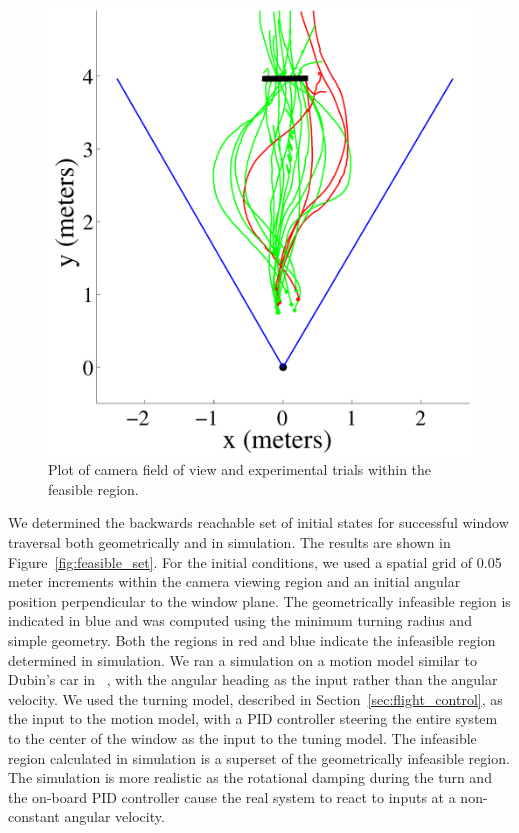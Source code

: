 \documentclass{aamas2013}
\begin{document}
\begin{figure}[tb]
\centering
\includegraphics[width=\linewidth]{figures/flight_paths_feasible.pdf}
\caption{Plot of camera field of view and experimental trials within the feasible region.}
\label{fig:flight_paths_feasible}
\end{figure}

We determined the backwards reachable set of initial states for successful
window traversal both geometrically and in simulation. The results are shown
in Figure~\ref{fig:feasible_set}. For the initial conditions, we used a
spatial grid of 0.05 meter increments within the camera viewing region and an
initial angular position perpendicular to the window plane. The geometrically
infeasible region is indicated in blue and was computed using the minimum
turning radius and simple geometry. Both the regions in red and blue indicate
the infeasible region determined in simulation. We ran a simulation on a
motion model similar to Dubin's car in ~\cite{lavalle:planning}, with the
angular heading as the input rather than the angular velocity. We used the
turning model, described in Section~\ref{sec:flight_control}, as the input to
the motion model, with a PID controller steering the entire system to the
center of the window as the input to the tuning model. The infeasible region
calculated in simulation is a superset of the geometrically infeasible region.
The simulation is more realistic as the rotational damping during the turn and
the on-board PID controller cause the real system to react to inputs at a
non-constant angular velocity.
\end{document}
